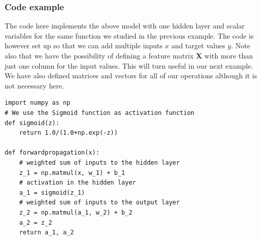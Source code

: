 \documentclass{beamer}
\begin{document}
\begin{frame}
\frametitle{Code example}

The code here implements the above model with one hidden layer and
scalar variables for the same function we studied in the previous
example.  The code is however set up so that we can add multiple
inputs $x$ and target values $y$. Note also that we have the
possibility of defining a feature matrix $\bm{X}$ with more than just
one column for the input values. This will turn useful in our next example. We have also defined matrices and vectors for all of our operations although it is not necessary here.


































































\begin{verbatim}
import numpy as np
# We use the Sigmoid function as activation function
def sigmoid(z):
    return 1.0/(1.0+np.exp(-z))

def forwardpropagation(x):
    # weighted sum of inputs to the hidden layer
    z_1 = np.matmul(x, w_1) + b_1
    # activation in the hidden layer
    a_1 = sigmoid(z_1)
    # weighted sum of inputs to the output layer
    z_2 = np.matmul(a_1, w_2) + b_2
    a_2 = z_2
    return a_1, a_2


\end{verbatim}
\end{frame}
\end{document}
